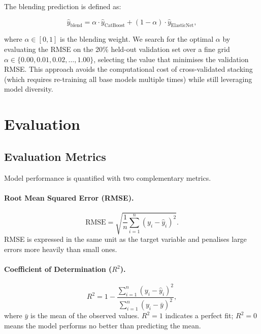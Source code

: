 The blending prediction is defined as:

\begin{equation}
  \hat{y}_{\text{blend}} = \alpha \cdot \hat{y}_{\text{CatBoost}}
    + (1 - \alpha) \cdot \hat{y}_{\text{ElasticNet}},
  \label{eq:blending}
\end{equation}

where $\alpha \in [0, 1]$ is the blending weight. We search for the optimal
$\alpha$ by evaluating the RMSE on the 20\% held-out validation set over
a fine grid $\alpha \in \{0.00, 0.01, 0.02, \ldots, 1.00\}$, selecting the
value that minimises the validation RMSE. This approach avoids the
computational cost of cross-validated stacking (which requires re-training
all base models multiple times) while still leveraging model diversity.

\section{Evaluation}

\subsection{Evaluation Metrics}

Model performance is quantified with two complementary metrics.

\paragraph{Root Mean Squared Error (RMSE).}
\begin{equation}
  \text{RMSE} = \sqrt{\frac{1}{n}\sum_{i=1}^{n}(y_i - \hat{y}_i)^2}.
  \label{eq:rmse}
\end{equation}
RMSE is expressed in the same unit as the target variable
and penalises large errors more heavily than small ones.

\paragraph{Coefficient of Determination ($R^2$).}
\begin{equation}
  R^2 = 1 - \frac{\sum_{i=1}^{n}(y_i - \hat{y}_i)^2}
                  {\sum_{i=1}^{n}(y_i - \bar{y})^2},
  \label{eq:r2}
\end{equation}
where $\bar{y}$ is the mean of the observed values.
$R^2 = 1$ indicates a perfect fit; $R^2 = 0$ means the model performs
no better than predicting the mean.

